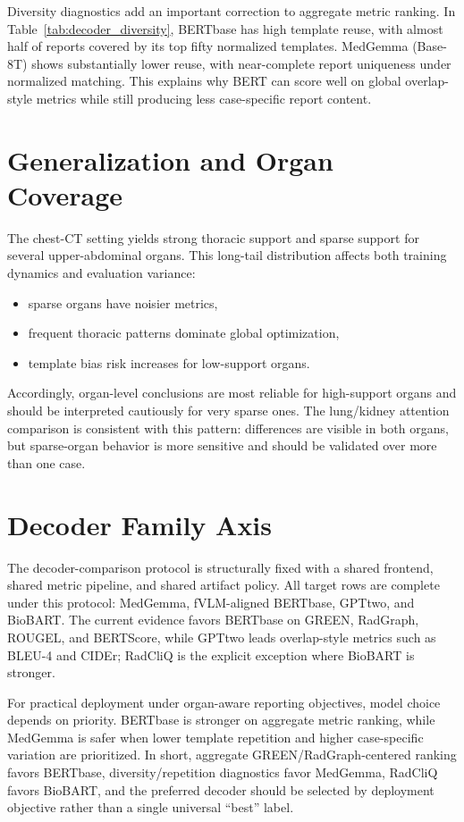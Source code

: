 Diversity diagnostics add an important correction to aggregate metric ranking. In Table~\ref{tab:decoder_diversity}, \ac{BERTbase} has high template reuse, with almost half of reports covered by its top fifty normalized templates. MedGemma (Base-8T) shows substantially lower reuse, with near-complete report uniqueness under normalized matching. This explains why BERT can score well on global overlap-style metrics while still producing less case-specific report content.

\section{Generalization and Organ Coverage}
The chest-CT setting yields strong thoracic support and sparse support for several upper-abdominal organs. This long-tail distribution affects both training dynamics and evaluation variance:
\begin{itemize}
    \item sparse organs have noisier metrics,
    \item frequent thoracic patterns dominate global optimization,
    \item template bias risk increases for low-support organs.
\end{itemize}
Accordingly, organ-level conclusions are most reliable for high-support organs and should be interpreted cautiously for very sparse ones.
The lung/kidney attention comparison is consistent with this pattern: differences are visible in both organs, but sparse-organ behavior is more sensitive and should be validated over more than one case.

\section{Decoder Family Axis}
The decoder-comparison protocol is structurally fixed with a shared frontend, shared metric pipeline, and shared artifact policy. All target rows are complete under this protocol: MedGemma, fVLM-aligned \ac{BERTbase}, \ac{GPTtwo}, and BioBART. The current evidence favors \ac{BERTbase} on \ac{GREEN}, \ac{RadGraph}, \ac{ROUGEL}, and \ac{BERTScore}, while \ac{GPTtwo} leads overlap-style metrics such as BLEU-4 and \ac{CIDEr}; \ac{RadCliQ} is the explicit exception where BioBART is stronger.

For practical deployment under organ-aware reporting objectives, model choice depends on priority. \ac{BERTbase} is stronger on aggregate metric ranking, while MedGemma is safer when lower template repetition and higher case-specific variation are prioritized.
In short, aggregate \ac{GREEN}/\ac{RadGraph}-centered ranking favors \ac{BERTbase}, diversity/repetition diagnostics favor MedGemma, \ac{RadCliQ} favors BioBART, and the preferred decoder should be selected by deployment objective rather than a single universal ``best'' label.

